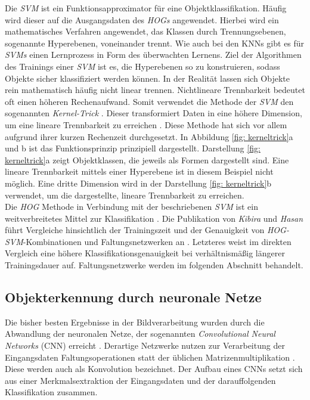 		
		
		Die \textit{SVM} ist ein Funktionsapproximator für eine Objektklassifikation. Häufig wird dieser auf die Ausgangsdaten des \textit{HOGs} angewendet. Hierbei wird ein mathematisches Verfahren angewendet, das Klassen durch Trennungsebenen, sogenannte Hyperebenen, voneinander trennt. Wie auch bei den KNNs gibt es für \textit{SVMs} einen Lernprozess in Form des überwachten Lernens. Ziel der Algorithmen des Trainings einer \textit{SVM} ist es, die Hyperebenen so zu konstruieren, sodass Objekte sicher klassifiziert werden können. In der Realität lassen sich Objekte rein mathematisch häufig nicht linear trennen. Nichtlineare Trennbarkeit bedeutet oft einen höheren Rechenaufwand. Somit verwendet die Methode der \textit{SVM} den sogenannten \textit{Kernel-Trick} \cite{svmalt}. Dieser transformiert Daten in eine höhere Dimension, um eine lineare Trennbarkeit zu erreichen \cite{svmalt}. Diese Methode hat sich vor allem aufgrund ihrer kurzen Rechenzeit durchgesetzt. In Abbildung \ref{fig: kerneltrick}a und b ist das Funktionsprinzip prinzipiell dargestellt. Darstellung \ref{fig: kerneltrick}a zeigt Objektklassen, die jeweils als Formen dargestellt sind. Eine lineare Trennbarkeit mittels einer Hyperebene ist in diesem Beispiel nicht möglich. Eine dritte Dimension wird in der Darstellung \ref{fig: kerneltrick}b verwendet, um die dargestellte, lineare Trennbarkeit zu erreichen.\\
		
		
			
		Die \textit{HOG} Methode in Verbindung mit der beschriebenen \textit{SVM} ist ein weitverbreitetes Mittel zur Klassifikation \cite{hogsvmvscnn}. Die Publikation von \textit{Kibira} und \textit{Hasan} führt Vergleiche hinsichtlich der Trainingszeit und der Genauigkeit von \textit{HOG-SVM}-Kombinationen und Faltungsnetzwerken an \cite{hogsvmvscnn}. Letzteres weist im direkten Vergleich eine höhere Klassifikationsgenauigkeit bei verhältnismäßig längerer Trainingsdauer auf. Faltungsnetzwerke werden im folgenden Abschnitt behandelt. 
	
		\subsection{Objekterkennung durch neuronale Netze}
		\label{subsec: Objekterkennung durch neuronale Netze}
		Die bisher besten Ergebnisse in der Bildverarbeitung wurden durch die Abwandlung der neuronalen Netze, der sogenannten \textit{Convolutional Neural Networks} (CNN) erreicht \cite{deeplearning}. Derartige Netzwerke nutzen zur Verarbeitung der Eingangsdaten Faltungsoperationen statt der üblichen Matrizenmultiplikation \cite{deeplearning}. Diese werden auch als Konvolution bezeichnet. Der Aufbau eines CNNs setzt sich aus einer Merkmalsextraktion der Eingangsdaten und der darauffolgenden Klassifikation zusammen.\\ 
		
